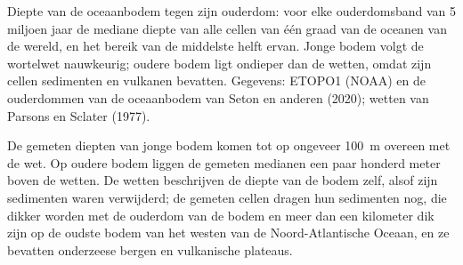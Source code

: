 \begin{omfigure}

{\small Diepte van de oceaanbodem tegen zijn ouderdom: voor elke ouderdomsband van
5 miljoen jaar de mediane diepte van alle cellen van één graad van de oceanen van de
wereld, en het bereik van de middelste helft ervan. Jonge bodem volgt de
wortelwet nauwkeurig; oudere bodem ligt ondieper dan de wetten, omdat
zijn cellen sedimenten en vulkanen bevatten. Gegevens: ETOPO1 (NOAA) en de
ouderdommen van de oceaanbodem van Seton en anderen (2020); wetten van Parsons en Sclater
(1977).}
\end{omfigure}

De gemeten diepten van jonge bodem komen tot op ongeveer \qty{100}{m} overeen met
de wet. Op oudere bodem liggen de gemeten medianen een paar honderd meter
boven de wetten. De wetten beschrijven de diepte van de bodem zelf, alsof zijn
sedimenten waren verwijderd; de gemeten cellen dragen hun sedimenten nog,
die dikker worden met de ouderdom van de bodem en meer dan een kilometer
dik zijn op de oudste bodem van het westen van de Noord-Atlantische Oceaan, en ze
bevatten onderzeese bergen en vulkanische plateaus.

